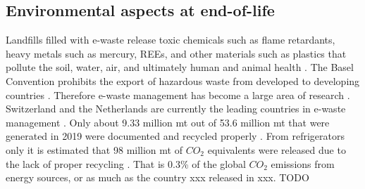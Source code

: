 \subsection{Environmental aspects at end-of-life}

Landfills filled with e-waste release toxic chemicals such as flame retardants, heavy metals such as mercury, REEs, and other materials such as plastics that pollute the soil, water, air, and ultimately human and animal health \cite{javed2024}. The Basel Convention prohibits the export of hazardous waste from developed to developing countries \cite{baselconv}. Therefore e-waste management has become a large area of research \cite{javed2024}. Switzerland and the Netherlands are currently the leading countries in e-waste management \cite{javed2024}.
Only about 9.33 million mt out of 53.6 million mt that were generated in 2019 were documented and recycled properly \cite{javed2024}. From refrigerators only it is estimated that 98 million mt of $CO_2$ equivalents were released due to the lack of proper recycling \cite{javed2024}. That is 0.3\% of the global $CO_2$ emissions from energy sources, or as much as the country xxx released in xxx. TODO

